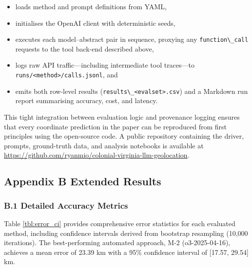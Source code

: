 \documentclass[
  10pt]{article}
\providecommand{\passthrough}[1]{#1}
\providecommand{\tightlist}{%
  \setlength{\itemsep}{0pt}\setlength{\parskip}{0pt}}
\begin{document}
\begin{itemize}
\tightlist
\item
  loads method and prompt definitions from YAML,
\item
  initialises the OpenAI client with deterministic seeds,
\item
  executes each model--abstract pair in sequence, proxying any
  \passthrough{\lstinline!function\_call!} requests to the tool back-end
  described above,
\item
  logs raw API traffic---including intermediate tool traces---to
  \passthrough{\lstinline!runs/<method>/calls.jsonl!}, and
\item
  emits both row-level results
  (\passthrough{\lstinline!results\_<evalset>.csv!}) and a Markdown run
  report summarising accuracy, cost, and latency.
\end{itemize}

This tight integration between evaluation logic and provenance logging
ensures that every coordinate prediction in the paper can be reproduced
from first principles using the open-source code. A public repository
containing the driver, prompts, ground-truth data, and analysis
notebooks is available at
\url{https://github.com/ryanmio/colonial-virginia-llm-geolocation}.

\subsection{Appendix B Extended
Results}\label{appendix-b-extended-results}

\subsubsection{B.1 Detailed Accuracy
Metrics}\label{b.1-detailed-accuracy-metrics}

Table \ref{tbl:error_ci} provides comprehensive error statistics for
each evaluated method, including confidence intervals derived from
bootstrap resampling (10,000 iterations). The best-performing automated
approach, M-2 (o3-2025-04-16), achieves a mean error of 23.39 km with a
95\% confidence interval of {[}17.57, 29.54{]} km.
\end{document}
